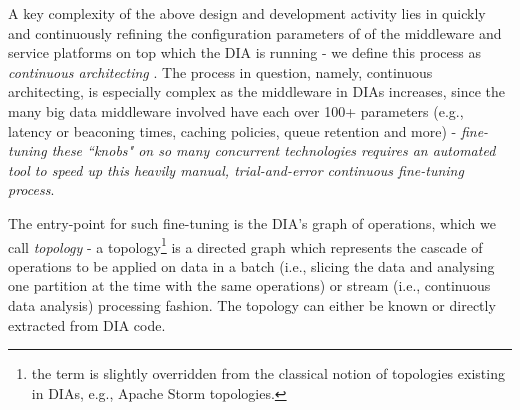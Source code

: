 A key complexity of the above design and development activity lies in quickly and continuously refining the configuration parameters of of the middleware and service platforms on top which the DIA is running - we define this process as \emph{continuous architecting} \cite{wicsabd}. The process in question, namely, continuous architecting, is especially complex as the middleware in DIAs increases, since the many big data middleware involved have each over 100+ parameters (e.g., latency or beaconing times, caching policies, queue retention and more) - \emph{fine-tuning these ``knobs" on so many concurrent technologies requires an automated tool to speed up this heavily manual, trial-and-error continuous fine-tuning process}.

The entry-point for such fine-tuning is the DIA's graph of operations, which we call \emph{topology} - a topology\footnote{the term is slightly overridden from the classical notion of topologies existing in DIAs, e.g., Apache Storm topologies.} is a directed graph which represents the cascade of operations to be applied on data in a batch (i.e., slicing the data and analysing one partition at the time with the same operations) or stream (i.e., continuous data analysis) processing fashion. The topology can either be known or directly extracted from DIA code.
%
%
%
